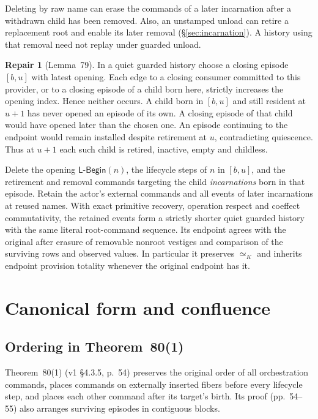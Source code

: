 \documentclass[11pt,a4paper]{article}
\theoremstyle{definition}
\newtheorem{repair}[definition]{Repair}
\theoremstyle{plain}
\newcommand{\LBegin}{\mathsf{L\text{-}Begin}}
\begin{document}
Deleting by raw name can erase the commands of a later incarnation after a withdrawn child has been removed. Also, an unstamped unload can retire a replacement root and enable its later removal (\S\ref{sec:incarnation}). A history using that removal need not replay under guarded unload.

\begin{repair}[Lemma~79]
In a quiet guarded history choose a closing episode $[b,u]$ with latest opening. Each edge to a closing consumer committed to this provider, or to a closing episode of a child born here, strictly increases the opening index. Hence neither occurs. A child born in $[b,u]$ and still resident at $u+1$ has never opened an episode of its own. A closing episode of that child would have opened later than the chosen one. An episode continuing to the endpoint would remain installed despite retirement at $u$, contradicting quiescence. Thus at $u+1$ each such child is retired, inactive, empty and childless.

Delete the opening $\LBegin(n)$, the lifecycle steps of $n$ in $[b,u]$, and the retirement and removal commands targeting the child \emph{incarnations} born in that episode. Retain the actor's external commands and all events of later incarnations at reused names.
With exact primitive recovery, operation respect and coeffect commutativity, the retained events form a strictly shorter quiet guarded history with the same literal root-command sequence. Its endpoint agrees with the original after erasure of removable nonroot vestiges and comparison of the surviving rows and observed values. In particular it preserves $\simeq_K$ and inherits endpoint provision totality whenever the original endpoint has it.
\end{repair}

\section{Canonical form and confluence}
\label{sec:confluence}

\subsection{Ordering in Theorem~80(1)}
\label{sec:t80-1}

Theorem~80(1) (v1 \S4.3.5, p.~54) preserves the original order of all orchestration commands, places commands on externally inserted fibers before every lifecycle step, and places each other command after its target's birth. Its proof (pp.~54--55) also arranges surviving episodes in contiguous blocks.
\end{document}
